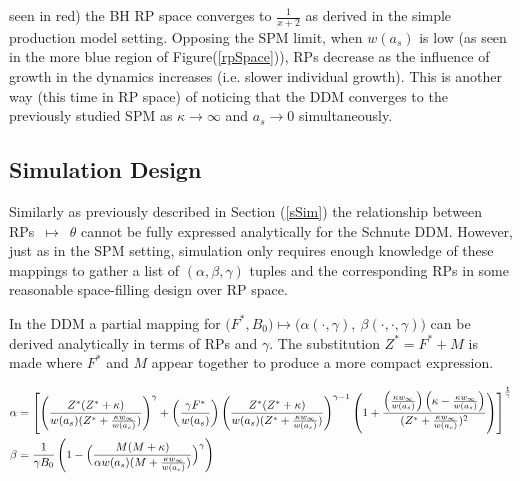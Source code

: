 seen in red) the BH RP space converges to $\frac{1}{x+2}$ as derived in the simple
production model setting. Opposing the SPM limit, when $w(a_s)$ is low 
(as seen in the more blue region of Figure(\ref{rpSpace})), RPs decrease as 
the influence of growth in the dynamics increases (i.e. slower individual growth). 
This is another way (this time in RP space) of noticing that the DDM converges 
to the previously studied SPM as $\kappa\to\infty$ and $a_s\to0$ simultaneously.

%
\subsection{Simulation Design\label{delayDesign}}

%
Similarly as previously described in Section (\ref{sSim}) the relationship
between \mbox{RPs $\mapsto$ $\theta$} cannot be fully expressed analytically for the
Schnute DDM. However, just as in the SPM setting, %
simulation only requires enough knowledge of these mappings to gather a list
of $(\alpha, \beta, \gamma)$ tuples and the corresponding RPs in some reasonable
space-filling design over RP space. %

In the DDM a partial mapping for
$\big(F^*, B_0\big) \mapsto \big(\alpha(\cdot, \gamma), ~\beta(\cdot, \cdot, \gamma)\big)$
can be derived analytically in terms of RPs and $\gamma$. The substitution
$Z^*=F^*+M$ is made where $F^*$ and $M$ appear together to produce a more
compact expression.

%
\begingroup
\scriptsize
\begin{align}
\alpha & = \left[ \oneA + \twoA \left( 1 + \thrA \right) \right]^{\frac{1}{\gamma}} \label{aDelay}\\
\beta &= \frac{1}{\gamma B_0} \left( 1 - \Big(\frac{M (M + \kappa)}{\alpha w(a_s)(M + \kr)}\Big)^\gamma\right) \label{bDelay}%
\end{align}
\endgroup

